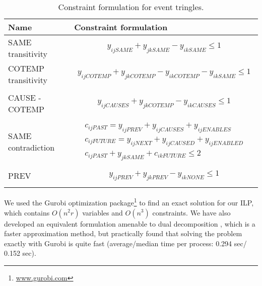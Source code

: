 \begin{table}[t]
{\footnotesize
\hfill{}
\begin{tabular}{|p{2cm}|p{5.1cm}|}
\hline
\textbf{Name} &\textbf{Constraint formulation}\\
\hline
SAME transitivity &  \begin{align}
y_{ijSAME} + y_{jkSAME} - y_{ikSAME} \leq 1
\end{align}\\

COTEMP transitivity &
\begin{align}
y_{ijCOTEMP} + y_{jkCOTEMP} - y_{ikCOTEMP} - y_{ikSAME} \leq 1
\end{align}\\
\\

CAUSE - COTEMP &
\begin{align}
y_{ijCAUSES} + y_{jkCOTEMP} - y_{ikCAUSES} \leq 1
\end{align}\\
\\

SAME contradiction &
\begin{align}
c_{ijPAST} = y_{ijPREV} + y_{ijCAUSES} + y_{ijENABLES} \\
c_{ijFUTURE} = y_{ijNEXT} + y_{ijCAUSED} + y_{ijENABLED} \\
c_{ijPAST} + y_{jkSAME} + c_{ikFUTURE} \leq 2
\end{align}\\
\\

PREV & 
\begin{align}
y_{ijPREV} + y_{jkPREV} - y_{ikNONE} \leq 1
\end{align}\\
\\


\hline
\end{tabular}}
\hfill{}
\caption{Constraint formulation for event tringles.}
\label{tab:constraintformulation}
\end{table}

We used the Gurobi optimization package\footnote{\url{www.gurobi.com}} to find an exact solution for our ILP, which contains $O(n^2r)$ variables and $O(n^3)$ constraints. We have also developed an equivalent formulation amenable to dual decomposition \cite{Reichart12}, which is a faster approximation method, but practically found that solving the problem exactly with Gurobi is quite fast (average/median time per process: 0.294 sec/ 0.152 sec).



